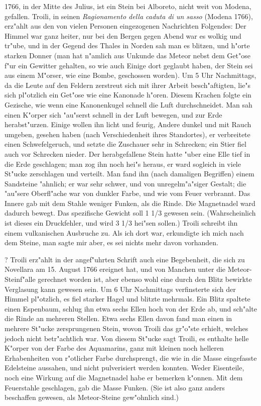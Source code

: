 \documentclass[a4paper, 11pt, oneside, polutonikogreek, german]{article}
\begin{document}
1766, in der Mitte des Julius, ist ein Stein bei Alboreto, nicht weit von Modena, gefallen. Troili, in seinen \emph{Ragionamento della caduta di un sasso} (Modena 1766), erz"ahlt aus den von vielen Personen eingezogenen Nachrichten Folgendes: Der Himmel war ganz heiter, nur bei den Bergen gegen Abend war es wolkig und tr"ube, und in der Gegend des Thales in Norden sah man es blitzen, und h"orte starken Donner (man hat n"amlich aus Unkunde das Meteor nebst dem Get"ose f"ur ein Gewitter gehalten, so wie auch Einige dort geglaubt haben, der Stein sei aus einem M"orser, wie eine Bombe, geschossen worden). Um 5 Uhr Nachmittags, da die Leute auf den Feldern zerstreut sich mit ihrer Arbeit besch"aftigten, lie"s sich pl"otzlich ein Get"ose wie eine Kanonade h"oren. Diesem Krachen folgte ein Gezische, wie wenn eine Kanonenkugel schnell die Luft durchschneidet. Man sah einen K"orper sich "au"serst schnell in der Luft bewegen, und zur Erde herabst"urzen. Einige wollen ihn licht und feurig, Andere dunkel und mit Rauch umgeben, gesehen haben (nach Verschiedenheit ihres Standortes), er verbreitete einen Schwefelgeruch, und setzte die Zuschauer sehr in Schrecken; ein Stier fiel auch vor Schrecken nieder. Der herabgefallene Stein hatte "uber eine Elle tief in die Erde geschlagen; man zog ihn noch hei"s heraus, er ward sogleich in viele St"ucke zerschlagen und verteilt. Man fand ihn (nach damaligen Begriffen) einem Sandsteine "ahnlich; er war sehr schwer, und von unregelm"a"siger Gestalt; die "au"sere Oberfl"ache war von dunkler Farbe, und wie vom Feuer verbrannt. Das Innere gab mit dem Stahle weniger Funken, als die Rinde. Die Magnetnadel ward dadurch bewegt. Das spezifische Gewicht soll 1 1/3 gewesen sein. (Wahrscheinlich ist dieses ein Druckfehler, und wird 3 1/3 hei"sen sollen.) Troili schreibt ihn einem vulkanischen Ausbruche zu. Als ich dort war, erkundigte ich mich nach dem Steine, man sagte mir aber, es sei nichts mehr davon vorhanden.

? Troili erz"ahlt in der angef"uhrten Schrift auch eine Begebenheit, die sich zu Novellara am 15. August 1766 ereignet hat, und von Manchen unter die Meteor-Steinf"alle gerechnet worden ist, aber ebenso wohl eine durch den Blitz bewirkte Verglasung kann gewesen sein. Um 6 Uhr Nachmittags verfinsterte sich der Himmel pl"otzlich, es fiel starker Hagel und blitzte mehrmals. Ein Blitz spaltete einen Espenbaum, schlug ihn etwa sechs Ellen hoch von der Erde ab, und sch"alte die Rinde an mehreren Stellen. Etwa sechs Ellen davon fand man einen in mehrere St"ucke zersprungenen Stein, wovon Troili das gr"o"ste erhielt, welches jedoch nicht betr"achtlich war. Von diesem St"ucke sagt Troili, es enthalte helle K"orper von der Farbe des Aquamarins, ganz mit kleinen noch helleren Erhabenheiten von r"otlicher Farbe durchsprengt, die wie in die Masse eingefasste Edelsteine aussahen, und nicht pulverisiert werden konnten. Weder Eisenteile, noch eine Wirkung auf die Magnetnadel habe er bemerken k"onnen. Mit dem Feuerstahle geschlagen, gab die Masse Funken. (Sie ist also ganz anders beschaffen gewesen, als Meteor-Steine gew"ohnlich sind.)
\end{document}
